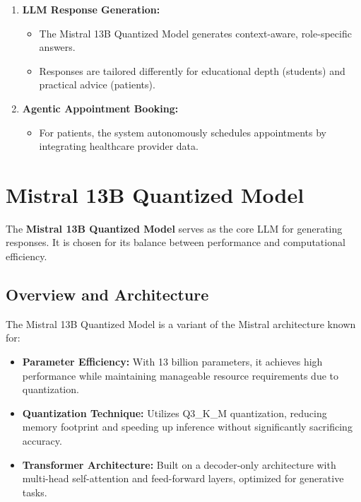 \begin{enumerate}[itemsep=2em]
  \item \textbf{LLM Response Generation:}
    \begin{itemize}
        \item The Mistral 13B Quantized Model generates context-aware, role-specific answers.
        \item Responses are tailored differently for educational depth (students) and practical advice (patients).
    \end{itemize}
    \vspace{2cm}
  \item \textbf{Agentic Appointment Booking:}
    \begin{itemize}
        \item For patients, the system autonomously schedules appointments by integrating healthcare provider data.
    \end{itemize}
\end{enumerate}

\section{Mistral 13B Quantized Model}
\label{sec:mistral_model}

The \textbf{Mistral 13B Quantized Model} serves as the core LLM for generating responses. It is chosen for its balance between performance and computational efficiency.

\subsection{Overview and Architecture}
\label{subsec:mistral_overview}
The Mistral 13B Quantized Model is a variant of the Mistral architecture known for:
\begin{itemize}[itemsep=2em]
    \item \textbf{Parameter Efficiency:} With 13 billion parameters, it achieves high performance while maintaining manageable resource requirements due to quantization.
    \item \textbf{Quantization Technique:} Utilizes Q3\_K\_M quantization, reducing memory footprint and speeding up inference without significantly sacrificing accuracy.
    \item \textbf{Transformer Architecture:} Built on a decoder-only architecture with multi-head self-attention and feed-forward layers, optimized for generative tasks.
\end{itemize}

